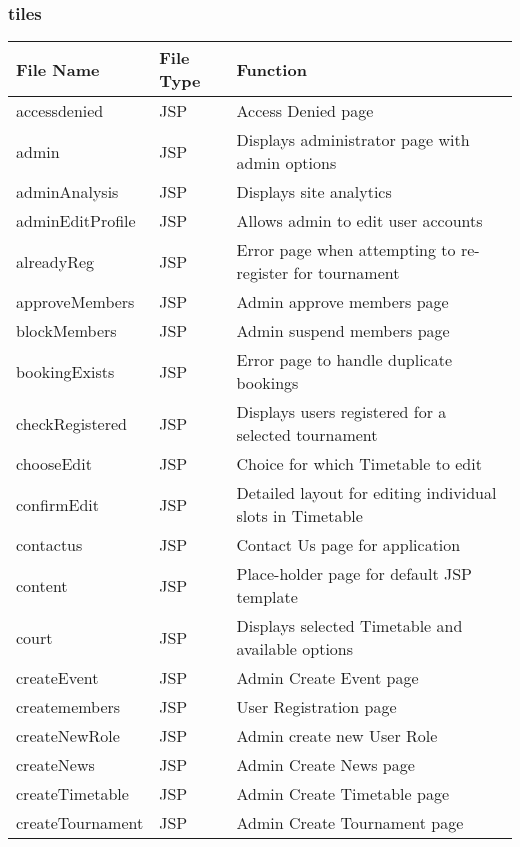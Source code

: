 \subsubsection{tiles}
\begin{table}[H]
\begin{center}
    \begin{tabular}{| l | l | p{5cm} |}
    \hline
    File Name & File Type & Function\\ \hline
	accessdenied & JSP & Access Denied page\\ \hline	
	admin & JSP & Displays administrator page with admin options\\ \hline	
	adminAnalysis & JSP & Displays site analytics\\ \hline	
	adminEditProfile & JSP & Allows admin to edit user accounts\\ \hline	
	alreadyReg & JSP & Error page when attempting to re-register for tournament \\ \hline	
	approveMembers & JSP & Admin approve members page\\ \hline	
	blockMembers & JSP & Admin suspend members page\\ \hline	
	bookingExists & JSP & Error page to handle duplicate bookings\\ \hline	
	checkRegistered & JSP & Displays users registered for a selected tournament\\ \hline	
	chooseEdit & JSP & Choice for which Timetable to edit\\ \hline	
	confirmEdit & JSP & Detailed layout for editing individual slots in Timetable\\ \hline	
	contactus & JSP & Contact Us page for application\\ \hline	
	content & JSP & Place-holder page for default JSP template\\ \hline	
	court & JSP & Displays selected Timetable and available options\\ \hline	
	createEvent & JSP & Admin Create Event page\\ \hline	
	createmembers & JSP & User Registration page\\ \hline	
	createNewRole & JSP & Admin create new User Role\\ \hline	
	createNews & JSP & Admin Create News page\\ \hline	
	createTimetable & JSP & Admin Create Timetable page\\ \hline	
	createTournament & JSP & Admin Create Tournament page\\ \hline	

\end{tabular}
\end{center}
\end{table}
